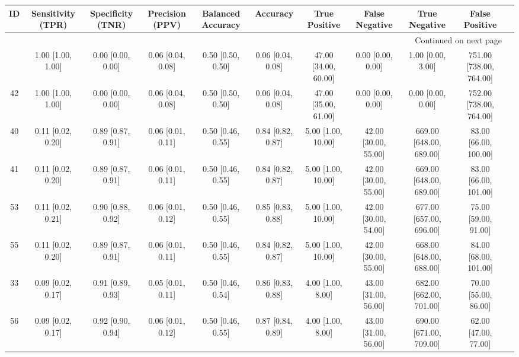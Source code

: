 \documentclass[8pt]{article}
\begin{document}
\begin{center}
\begin{footnotesize}
\begin{longtable}{|ccccccccccc|}
\toprule
 ID &  Sensitivity (TPR) &  Specificity (TNR) &    Precision (PPV) &  Balanced Accuracy &           Accuracy &         True Positive &        False Negative &            True Negative &           False Positive \\
\midrule
\endhead
\midrule
\multicolumn{10}{r}{{Continued on next page}} \\
\midrule
\endfoot

\bottomrule
\endlastfoot
 38 &  1.00 [1.00, 1.00] &  0.00 [0.00, 0.00] &  0.06 [0.04, 0.08] &  0.50 [0.50, 0.50] &  0.06 [0.04, 0.08] &  47.00 [34.00, 60.00] &     0.00 [0.00, 0.00] &        1.00 [0.00, 3.00] &  751.00 [738.00, 764.00] \\
 42 &  1.00 [1.00, 1.00] &  0.00 [0.00, 0.00] &  0.06 [0.04, 0.08] &  0.50 [0.50, 0.50] &  0.06 [0.04, 0.08] &  47.00 [35.00, 61.00] &     0.00 [0.00, 0.00] &        0.00 [0.00, 0.00] &  752.00 [738.00, 764.00] \\
 40 &  0.11 [0.02, 0.20] &  0.89 [0.87, 0.91] &  0.06 [0.01, 0.11] &  0.50 [0.46, 0.55] &  0.84 [0.82, 0.87] &    5.00 [1.00, 10.00] &  42.00 [30.00, 55.00] &  669.00 [648.00, 689.00] &    83.00 [66.00, 100.00] \\
 41 &  0.11 [0.02, 0.20] &  0.89 [0.87, 0.91] &  0.06 [0.01, 0.11] &  0.50 [0.46, 0.55] &  0.84 [0.82, 0.87] &    5.00 [1.00, 10.00] &  42.00 [30.00, 55.00] &  669.00 [648.00, 689.00] &    83.00 [66.00, 101.00] \\
 53 &  0.11 [0.02, 0.21] &  0.90 [0.88, 0.92] &  0.06 [0.01, 0.12] &  0.50 [0.46, 0.55] &  0.85 [0.83, 0.88] &    5.00 [1.00, 10.00] &  42.00 [30.00, 54.00] &  677.00 [657.00, 696.00] &     75.00 [59.00, 91.00] \\
 55 &  0.11 [0.02, 0.20] &  0.89 [0.87, 0.91] &  0.06 [0.01, 0.11] &  0.50 [0.46, 0.55] &  0.84 [0.82, 0.87] &    5.00 [1.00, 10.00] &  42.00 [30.00, 55.00] &  668.00 [648.00, 688.00] &    84.00 [68.00, 101.00] \\
 33 &  0.09 [0.02, 0.17] &  0.91 [0.89, 0.93] &  0.05 [0.01, 0.11] &  0.50 [0.46, 0.54] &  0.86 [0.83, 0.88] &     4.00 [1.00, 8.00] &  43.00 [31.00, 56.00] &  682.00 [662.00, 701.00] &     70.00 [55.00, 86.00] \\
 56 &  0.09 [0.02, 0.17] &  0.92 [0.90, 0.94] &  0.06 [0.01, 0.12] &  0.50 [0.46, 0.55] &  0.87 [0.84, 0.89] &     4.00 [1.00, 8.00] &  43.00 [31.00, 56.00] &  690.00 [671.00, 709.00] &     62.00 [47.00, 77.00] \\

\end{longtable}
\end{footnotesize}
\end{center}
\end{document}
